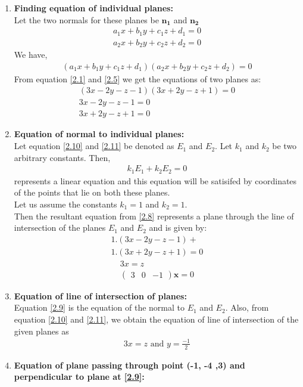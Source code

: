 \documentclass[journal,12pt,twocolumn]{IEEEtran}
\let\vec\mathbf
\numberwithin{equation}{subsection}
\newcommand{\myvec}[1]{\ensuremath{\begin{pmatrix}#1\end{pmatrix}}}
\begin{document}
\begin{enumerate}
\item \textbf{Finding equation of individual planes:}\\
Let the two normals for these planes be $\vec{n_1}$ and $\vec{n_2}$
\begin{align}
   a_{1}x+ b_{1}y +c_{1}z +d_{1} =0\label{2.2}\\
  a_{2}x +b_{2}y +c_{2}z +d_{2} =0\label{2.3}
\end{align}
We have,
\begin{align}
   (  a_{1}x+ b_{1}y +c_{1}z +d_{1})( a_{2}x +b_{2}y +c_{2}z +d_{2} ) = 0 \label{2.5}
\end{align}
From equation \eqref{2.1} and \eqref{2.5} we get the equations of two planes as:
\begin{align}
   ( 3x- 2y -z -1)( 3x +2y-z +1 ) = 0 \label{2.6}\\
   3x- 2y -z -1 = 0  \label{2.10} \\
 3x +2y-z +1  = 0 \label{2.11}
\end{align}
\item \textbf{Equation of normal to individual planes:}\\
Let equation \eqref {2.10} and \eqref{2.11} be denoted as $E_{1 }$ and $ E_{2}$. Let $ k_{1}$ and $k_{2}$ be two arbitrary constants. Then,
 \begin{align}
   k_{1}E_{1} + k_{2}E_{2} = 0\label{2.8}
\end{align}
represents a linear equation and this equation will be satisifed by coordinates of the points that lie on both these planes.\\
 Let us assume the constants $ k_{1} = 1$  and $k_{2} = 1$.\\
Then the resultant equation from \eqref{2.8} represents a plane through the line of intersection of the planes $E_{1}$ and $E_{2}$ and is given by:
\begin{multline}
   1.(3x- 2y -z -1) + \\1.( 3x +2y-z +1 ) =0
\end{multline}
\begin{align}
  3x = z\\ 
\myvec{3& 0& -1} \vec{x} = 0   \label{2.9}
\end{align}
\item \textbf{Equation of line of intersection of planes:}\\
Equation \eqref {2.9} is the equation of the normal to  $E_{1}$ and $E_{2}$. Also, from equation \eqref{2.10} and     \eqref {2.11}, we obtain the equation of line of intersection of the given planes  as
\begin{align}
   3x = z \text{ and } y =\frac{-1}{2}\label{2.16}
\end{align}
\item \textbf{Equation of plane passing through point (-1, -4 ,3) and perpendicular to plane at \eqref{2.9}:}\\


\end{enumerate}
\end{document}
